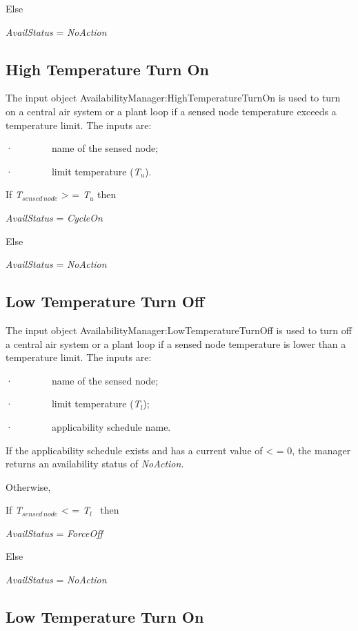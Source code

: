 Else

\emph{AvailStatus} = \emph{NoAction}

\subsection{High Temperature Turn On}\label{high-temperature-turn-on}

The input object AvailabilityManager:HighTemperatureTurnOn is used to turn on a central air system or a plant loop if a sensed node temperature exceeds a temperature limit. The inputs are:

·~~~~~~~~name of the sensed node;

·~~~~~~~~limit temperature (\emph{T\(_{u}\)}).

If \emph{T\(_{sensed\, node}\)} \textgreater{} = \emph{T\(_{u}\)} then

\emph{AvailStatus} = \emph{CycleOn}

Else

\emph{AvailStatus} = \emph{NoAction}

\subsection{Low Temperature Turn Off}\label{low-temperature-turn-off}

The input object AvailabilityManager:LowTemperatureTurnOff is used to turn off a central air system or a plant loop if a sensed node temperature is lower than a temperature limit. The inputs are:

·~~~~~~~~name of the sensed node;

·~~~~~~~~limit temperature (\emph{T\(_{l}\)});

·~~~~~~~~applicability schedule name.

If the applicability schedule exists and has a current value of \textless{} = 0, the manager returns an availability status of \emph{NoAction}.

Otherwise,

If \emph{T\(_{sensed\, node}\)} \textless{} = \emph{T\(_{l}\)}~ then

\emph{AvailStatus} = \emph{ForceOff}

Else

\emph{AvailStatus} = \emph{NoAction}

\subsection{Low Temperature Turn On}\label{low-temperature-turn-on}

